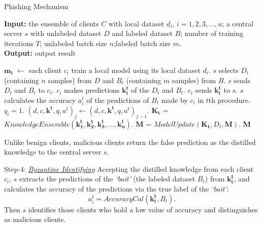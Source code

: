 \documentclass[journal]{IEEEtran}
\begin{document}
  \begin{algorithm}[t]
    \caption{Phishing Mechanism} 
    \hspace*{0.02in} {\bf Input:} 
    the ensemble of clients $C$ with local dataset $d_i$, $i=1,2,3,...,u$; a central server $s$ with unlabeled dataset $D$ and labeled dataset $B$; number of training iterations $T$; unlabeled batch size $n$;labeled batch size $m$.\\
    \hspace*{0.02in} {\bf Output:} 
    output result
    \begin{algorithmic}[1]
      \State $\mathbf{m_i}$ $\gets$ each client $c_i$ train a local model using its local dataset $d_i$.
        \State $s$ selects $D_t$ (containing $n$ samples) from $D$ and $B_t$ (containing $m$ samples) from $B$.
          \State $s$ sends $D_t$ and $B_t$ to $c_i$.
          \State $c_i$ makes predictions $\mathbf{k_i^t}$ of the $D_t$ and $B_t$.
          \State $c_i$ sends $\mathbf{k_i^t}$ to $s$.
          \State $s$ calculates the accuracy $a_i^t$ of the predictions of $B_t$ made by $c_i$ in $t$th procedure.
            \State $q_i = 1$.
              \State $(d,c,\mathbf{k^t},q,a^t)_j \gets (d,c,\mathbf{k^t},q,a^t)_{j-1}$.
            \EndFor
          \EndIf
        \EndFor
        \State $\mathbf{K_t}$ = $KnowledgeEnsemble(\mathbf{k_1^t},\mathbf{k_2^t},\mathbf{k_3^t},...,\mathbf{k_u^t})$.
        \State $\mathbf{M}$ = $ModelUpdate(\mathbf{K_t}, D_t, \mathbf{M})$.
      \EndFor
      \State\Return $\mathbf{M}$
    \end{algorithmic}
    \end{algorithm}


  Unlike benign clients, malicious clients return the false prediction as the distilled knowledge to the central server $s$.
  \par Step-4: \ul{\textit{Byzantine Identifying}} Accepting the distilled knowledge from each client $c_i$, $s$ extracts the predictions of the \textit{`bait'} (the labeled dataset $B_t$) from $\mathbf{k_i^t}$, and calculates the accuracy of the predictions via the true label of the \textit{`bait'}:
  \begin{equation}
    a_i^t=AccuracyCal(\mathbf{k_i^t}, B_t).
  \end{equation}
  Then $s$ identifies those clients who hold a low value of accuracy and distinguishes as malicious clients.
\end{document}
